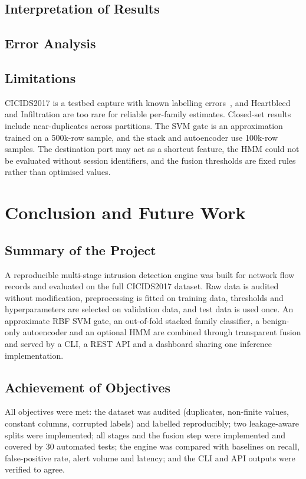 \documentclass[12pt,a4paper,oneside]{report}
\begin{document}


\section{Interpretation of Results}


\section{Error Analysis}


\section{Limitations}
CICIDS2017 is a testbed capture with known labelling errors~\cite{engelen2021troubleshooting,lanvin2022errors}, and Heartbleed and Infiltration are too rare for reliable per-family estimates. Closed-set results include near-duplicates across partitions. The SVM gate is an approximation trained on a 500k-row sample, and the stack and autoencoder use 100k-row samples. The destination port may act as a shortcut feature, the HMM could not be evaluated without session identifiers, and the fusion thresholds are fixed rules rather than optimised values.

\chapter{Conclusion and Future Work}

\section{Summary of the Project}
A reproducible multi-stage intrusion detection engine was built for network flow records and evaluated on the full CICIDS2017 dataset. Raw data is audited without modification, preprocessing is fitted on training data, thresholds and hyperparameters are selected on validation data, and test data is used once. An approximate RBF SVM gate, an out-of-fold stacked family classifier, a benign-only autoencoder and an optional HMM are combined through transparent fusion and served by a CLI, a REST API and a dashboard sharing one inference implementation.

\section{Achievement of Objectives}
All objectives were met: the dataset was audited (duplicates, non-finite values, constant columns, corrupted labels) and labelled reproducibly; two leakage-aware splits were implemented; all stages and the fusion step were implemented and covered by 30 automated tests; the engine was compared with baselines on recall, false-positive rate, alert volume and latency; and the CLI and API outputs were verified to agree.
\end{document}
